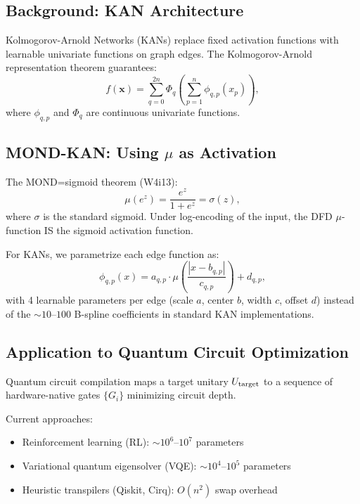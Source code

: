 \documentclass[11pt]{article}
\theoremstyle{definition}
\theoremstyle{remark}
\begin{document}
\subsection{Background: KAN Architecture}

Kolmogorov-Arnold Networks (KANs) replace fixed activation functions with
learnable univariate functions on graph edges.  The Kolmogorov-Arnold
representation theorem guarantees:
\begin{equation}
  f(\mathbf{x}) = \sum_{q=0}^{2n} \Phi_q\!\left(\sum_{p=1}^n \phi_{q,p}(x_p)\right),
\end{equation}
where $\phi_{q,p}$ and $\Phi_q$ are continuous univariate functions.

\subsection{MOND-KAN: Using $\mu$ as Activation}

The MOND=sigmoid theorem (W4i13):
\begin{equation}
  \mu(e^z) = \frac{e^z}{1 + e^z} = \sigma(z),
\end{equation}
where $\sigma$ is the standard sigmoid.  Under log-encoding of the input,
the DFD $\mu$-function IS the sigmoid activation function.

For KANs, we parametrize each edge function as:
\begin{equation}
  \phi_{q,p}(x) = a_{q,p} \cdot \mu\!\left(\frac{|x - b_{q,p}|}{c_{q,p}}\right)
  + d_{q,p},
\end{equation}
with 4 learnable parameters per edge (scale $a$, center $b$, width $c$,
offset $d$) instead of the $\sim 10$--$100$ B-spline coefficients in
standard KAN implementations.

\subsection{Application to Quantum Circuit Optimization}

Quantum circuit compilation maps a target unitary $U_{\rm target}$ to a
sequence of hardware-native gates $\{G_i\}$ minimizing circuit depth.

Current approaches:
\begin{itemize}
  \item Reinforcement learning (RL): $\sim 10^6$--$10^7$ parameters
  \item Variational quantum eigensolver (VQE): $\sim 10^4$--$10^5$ parameters
  \item Heuristic transpilers (Qiskit, Cirq): $O(n^2)$ swap overhead
\end{itemize}
\end{document}
